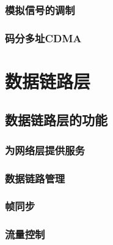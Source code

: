 \documentclass[lang=cn,newtx,10pt,scheme=chinese]{../../elegantbook}
\begin{document}

\subsection{模拟信号的调制}
\subsection{码分多址CDMA}



\chapter{数据链路层}

\section{数据链路层的功能}
\subsection{为网络层提供服务}
\subsection{数据链路管理}
\subsection{帧同步}
\subsection{流量控制}
\end{document}
